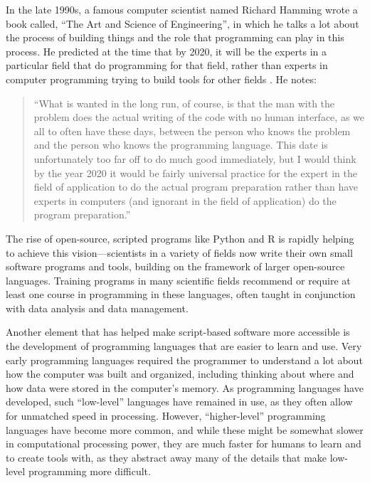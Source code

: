 \documentclass[]{tufte-book}
\begin{document}
In the late 1990s, a famous computer scientist named Richard Hamming wrote a
book called, ``The Art and Science of Engineering'', in which he talks a lot about
the process of building things and the role that programming can play in this
process. He predicted at the time that by 2020, it will be the experts in a
particular field that do programming for that field, rather than experts in
computer programming trying to build tools for other fields \citep{hamming1997art}.
He notes:

\begin{quote}
``What is wanted in the long run, of course, is that the man with the problem
does the actual writing of the code with no human interface, as we all to often
have these days, between the person who knows the problem and the person who
knows the programming language. This date is unfortunately too far off to
do much good immediately, but I would think by the year 2020 it would be
fairly universal practice for the expert in the field of application to do
the actual program preparation rather than have experts in computers (and
ignorant in the field of application) do the program preparation.'' \citep{hamming1997art}
\end{quote}

The rise of open-source, scripted programs like Python and R is rapidly helping to
achieve this vision---scientists in a variety of fields now write their own
small software programs and tools, building on the framework of larger
open-source languages. Training programs in many scientific fields recommend
or require at least one course in programming in these languages, often
taught in conjunction with data analysis and data management.

Another element that has helped make script-based software more accessible is
the development of programming languages that are easier to learn and use. Very
early programming languages required the programmer to understand a lot about
how the computer was built and organized, including thinking about where and how
data were stored in the computer's memory. As programming languages have
developed, such ``low-level'' languages have remained in use, as they often allow
for unmatched speed in processing. However, ``higher-level'' programming languages
have become more common, and while these might be somewhat slower in
computational processing power, they are much faster for humans to learn and to
create tools with, as they abstract away many of the details that make low-level
programming more difficult.
\end{document}
